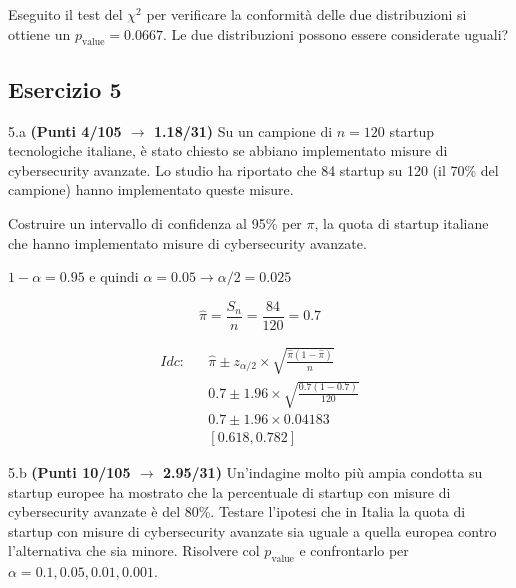\documentclass[
  11pt,
]{book}
\theoremstyle{mytheoremstyle}
\theoremstyle{mydefstyle}
\newenvironment{sol}
  {
  \begin{tcolorbox}[enhanced,breakable,arc=0.1mm,boxrule=1pt,colback=white,colframe=iblue,
  title=\bf \fontfamily{lmss}\selectfont \hspace{.5 cm} Soluzione,drop fuzzy shadow]

}{
\end{tcolorbox}
  }
\begin{document}
Eseguito il test del \(\chi^2\) per verificare la conformità delle due distribuzioni si ottiene un \(p_\text{value}=0.0667\). Le due distribuzioni possono essere considerate uguali?

\subsection{Esercizio 5}\label{esercizio-5-40}

5.a \textbf{(Punti 4/105 \(\rightarrow\) 1.18/31)} Su un campione di \(n = 120\) startup tecnologiche italiane, è stato chiesto se abbiano implementato misure di cybersecurity avanzate. Lo studio ha riportato che 84 startup su 120 (il 70\% del campione) hanno implementato queste misure.

Costruire un intervallo di confidenza al 95\% per \(\pi\), la quota di startup italiane che hanno implementato misure di cybersecurity avanzate.

\begin{sol}
\(1-\alpha =0.95\) e quindi \(\alpha=0.05\rightarrow \alpha/2=0.025\)

\[
  \hat\pi = \frac{S_n}n = \frac{ 84 }{ 120 }= 0.7 
\]

\begin{eqnarray*}
  Idc: & &  \hat\pi \pm  z_{\alpha/2} \times \sqrt{\frac{\hat\pi(1-\hat\pi)}{n}} \\
     & &  0.7 \pm  1.96 \times \sqrt{\frac{ 0.7 (1- 0.7 )}{ 120 }} \\
     & &  0.7 \pm  1.96 \times  0.04183 \\
     & & [ 0.618 ,  0.782 ]
\end{eqnarray*}

\end{sol}

5.b \textbf{(Punti 10/105 \(\rightarrow\) 2.95/31)} Un'indagine molto più ampia condotta su startup europee ha mostrato che la percentuale di startup con misure di cybersecurity avanzate è del 80\%. Testare l'ipotesi che in Italia la quota di startup con misure di cybersecurity avanzate sia uguale a quella europea contro l'alternativa che sia minore. Risolvere col \(p_\text{value}\) e confrontarlo per \(\alpha=0.1,0.05,0.01,0.001\).
\end{document}

